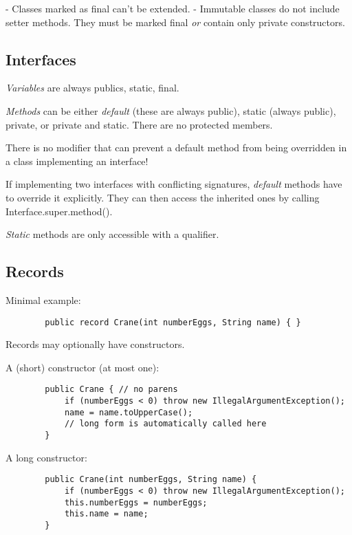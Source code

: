 \documentclass{scrartcl}
\begin{document}
    - Classes marked as final can’t be extended.
    - Immutable classes do not include setter methods. They must be marked final \textit{or} contain only private constructors.

\subsection{Interfaces}

    \textit{Variables} are always publics, static, final.

    \textit{Methods} can be either \textit{default} (these are always public), static (always public), private, or private and static. There are no protected members.

    There is no modifier that can prevent a default method from being overridden in a class implementing an interface!

    If implementing two interfaces with conflicting signatures, \textit{default} methods have to override it explicitly. They  can then access the inherited ones by calling Interface.super.method().

    \textit{Static} methods are only accessible with a qualifier.

\subsection{Records}

    Minimal example:

    \begin{lstlisting}
        public record Crane(int numberEggs, String name) { }
    \end{lstlisting}

    Records may optionally have constructors.

    A (short) constructor (at most one):

    \begin{lstlisting}
        public Crane { // no parens
            if (numberEggs < 0) throw new IllegalArgumentException();
            name = name.toUpperCase();
            // long form is automatically called here
        }
    \end{lstlisting}

    A long constructor:

    \begin{lstlisting}
        public Crane(int numberEggs, String name) {
            if (numberEggs < 0) throw new IllegalArgumentException();
            this.numberEggs = numberEggs;
            this.name = name;
        }
    \end{lstlisting}
\end{document}
